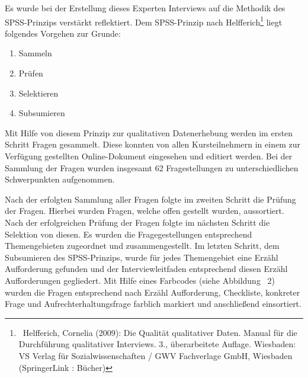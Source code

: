 \documentclass[a4paper]{article}
\newcommand\liststyleLi{%
\renewcommand\theenumi{\arabic{enumi}}
\renewcommand\theenumii{\arabic{enumii}}
\renewcommand\theenumiii{\arabic{enumiii}}
\renewcommand\theenumiv{\arabic{enumiv}}
\renewcommand\labelenumi{\theenumi.}
\renewcommand\labelenumii{\theenumii.}
\renewcommand\labelenumiii{\theenumiii.}
\renewcommand\labelenumiv{\theenumiv.}
}
\begin{document}
\bigskip

{\sffamily\mdseries\color{black}
Es wurde bei der Erstellung dieses Experten Interviews auf die Methodik des SPSS-Prinzips verstärkt reflektiert. Dem
SPSS-Prinzip nach Helfferich\footnote{\ Helfferich, Cornelia (2009): Die Qualität qualitativer Daten. Manual für die
Durchführung qualitativer Interviews. 3., überarbeitete Auflage. Wiesbaden: VS Verlag für Sozialwissenschaften / GWV
Fachverlage GmbH, Wiesbaden (SpringerLink : Bücher)} liegt folgendes Vorgehen zur Grunde:}


\bigskip

\liststyleLi
\begin{enumerate}
\item {\sffamily\color{black}
Sammeln}
\item {\sffamily\color{black}
Prüfen}
\item {\sffamily\color{black}
Selektieren}
\item {\sffamily\color{black}
Subsumieren}


\bigskip
\end{enumerate}
{\sffamily\mdseries\color{black}
Mit Hilfe von diesem Prinzip zur qualitativen Datenerhebung werden im ersten Schritt Fragen gesammelt. Diese konnten von
allen Kursteilnehmern in einem zur Verfügung gestellten Online-Dokument eingesehen und editiert werden. Bei der
Sammlung der Fragen wurden insgesamt 62 Fragestellungen zu unterschiedlichen Schwerpunkten aufgenommen.}

{\sffamily\mdseries\color{black}
Nach der erfolgten Sammlung aller Fragen folgte im zweiten Schritt die Prüfung der Fragen. Hierbei wurden Fragen, welche
offen gestellt wurden, aussortiert. Nach der erfolgreichen Prüfung der Fragen folgte im nächsten Schritt die Selektion
von diesen. Es wurden die Fragegestellungen entsprechend Themengebieten zugeordnet und zusammengestellt. Im letzten
Schritt, dem Subsumieren des SPSS-Prinzips, wurde für jedes Themengebiet eine Erzähl Aufforderung gefunden und der
Interviewleitfaden entsprechend diesen Erzähl Aufforderungen gegliedert. Mit Hilfe eines Farbcodes (siehe Abbildung
\ 2) wurden die Fragen entsprechend nach Erzähl Aufforderung, Checkliste, konkreter Frage und Aufrechterhaltungsfrage
farblich markiert und anschließend einsortiert. }
\end{document}
